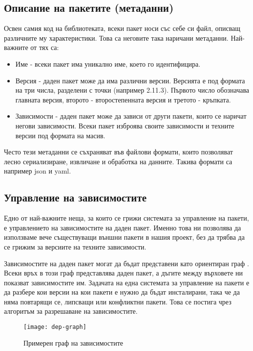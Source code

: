 \subsection{Описание на пакетите (метаданни)}

Освен самия код на библиотеката, всеки пакет носи със себе си файл, описващ
различните му характеристики. Това са неговите така наричани метаданни.
Най-важните от тях са:

\begin{itemize}
    \item Име - всеки пакет има уникално име, което го идентифицира.
    \item Версия \cite{semver} - даден пакет може да има различни версии.
          Версията е под формата на три числа, разделени с точки (например
          2.11.3). Първото число обозначава главната версия, второто -
          второстепенната версия и третото - кръпката.
    \item Зависимости - даден пакет може да зависи от други пакети, които се
          наричат негови зависимости. Всеки пакет изброява своите зависимости и
          техните версии под формата на масив.
\end{itemize}

Често тези метаданни се съхраняват във файлови формати, които позволяват лесно
сериализиране, извличане и обработка на данните. Такива формати са например
\acrshort{json} и \acrshort{yaml}.


\subsection{Управление на зависимостите}

Едно от най-важните неща, за които се грижи системата за управление на пакети, е
управлението на зависимостите на даден пакет. Именно това ни позволява да
използваме вече съществуващи външни пакети в нашия проект, без да трябва да се
грижим за версиите на техните зависимости.

Зависимостите на даден пакет могат да бъдат представени като ориентиран граф
. Всеки връх в този граф представлява даден пакет, а
дъгите между върховете ни показват зависимостите им. Задачата на една системата
за управление на пакети е да разбере кои версии на кои пакети е нужно да бъдат
инсталирани, така че да няма повтарящи се, липсващи или конфликтни пакети. Това
се постига чрез алгоритъм за разрешаване на зависимостите.

\begin{figure}[h]
    \centering
    \texttt{[image: dep-graph]}
    \caption{Примерен граф на зависимостите}
    \label{fig:dep-graph}
\end{figure}


